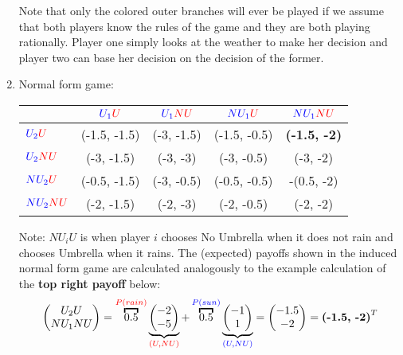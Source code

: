\documentclass[../main.tex]{subfiles}
\begin{document}
\begin{solution}
\begin{enumerate}
\begin{center}
\end{center}
Note that only the colored outer branches will ever be played if we assume that both players know the rules of the game and they are both playing rationally.
Player one simply looks at the weather to make her decision and player two can base her decision on the decision of the former.
\item Normal form game:
\begin{center}
	    \begin{tabular}{|l|c|c|c|c|}
	    \hline
		& $\textcolor{blue}{U_1}\textcolor{red}{U}$ 		& $\textcolor{blue}{U_1}\textcolor{red}{NU}$ 		& $\textcolor{blue}{NU_1}\textcolor{red}{U}$ 		& $\textcolor{blue}{NU_1}\textcolor{red}{NU}$ 	\\
	    \hline
		$\textcolor{blue}{U_2}\textcolor{red}{U}$ 	  & (-1.5, -1.5) 	& (-3, -1.5)	  & (-1.5, -0.5) 	& \textbf{(-1.5, -2)}		\\
	    \hline
		$\textcolor{blue}{U_2}\textcolor{red}{NU}$  	& (-3, -1.5) 		& (-3, -3)		  & (-3, -0.5) 		& (-3, -2)			\\
	    \hline
		$\textcolor{blue}{NU_2}\textcolor{red}{U}$  	& (-0.5, -1.5) 	& (-3, -0.5) 	  & (-0.5, -0.5) 	& -(0.5, -2)    \\
	    \hline
		$\textcolor{blue}{NU_2}\textcolor{red}{NU}$  	& (-2, -1.5)	 	& (-2, -3) 		 & (-2, -0.5) 		& (-2, -2)		  \\
	    \hline
	    \end{tabular}
    \end{center}
    Note: $NU_i U $ is when player $i$ chooses No Umbrella when it does not rain and chooses Umbrella when it rains.
	The (expected) payoffs shown in the induced normal form game are calculated analogously to the example calculation of the \textbf{top right payoff} below:
	\[
		\begin{pmatrix}U_2U\\NU_1NU\end{pmatrix} = \overbracket{0.5}^{\textcolor{red}{P(rain)}} \underbrace{\begin{pmatrix}-2\\-5\end{pmatrix}}_{\textcolor{red}{(U,NU)}} + \overbracket{0.5}^{\textcolor{blue}{P(sun)}} \underbrace{\begin{pmatrix}-1\\1\end{pmatrix}}_{\textcolor{blue}{(U,NU)}} = \begin{pmatrix}-1.5 \\ -2 \end{pmatrix} = \textbf{\text{(-1.5, -2)}}^T
	\]
\end{enumerate}
\end{solution}
\end{document}
